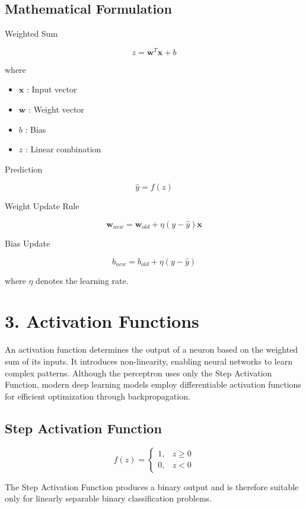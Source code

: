 \documentclass[11pt]{article}
\begin{document}
\subsection*{Mathematical Formulation}

Weighted Sum

\[
z=\mathbf{w}^{T}\mathbf{x}+b
\]

where

\begin{itemize}
\item $\mathbf{x}$ : Input vector
\item $\mathbf{w}$ : Weight vector
\item $b$ : Bias
\item $z$ : Linear combination
\end{itemize}

Prediction

\[
\hat y=f(z)
\]

Weight Update Rule

\[
\mathbf{w}_{new}
=
\mathbf{w}_{old}
+
\eta
(y-\hat y)
\mathbf{x}
\]

Bias Update

\[
b_{new}
=
b_{old}
+
\eta
(y-\hat y)
\]

where $\eta$ denotes the learning rate.


\section*{3. Activation Functions}

An activation function determines the output of a neuron based on the weighted sum of its inputs. It introduces non-linearity, enabling neural networks to learn complex patterns. Although the perceptron uses only the Step Activation Function, modern deep learning models employ differentiable activation functions for efficient optimization through backpropagation.

\subsection*{Step Activation Function}

\[
f(z)=
\begin{cases}
1,&z\ge0\\
0,&z<0
\end{cases}
\]

The Step Activation Function produces a binary output and is therefore suitable only for linearly separable binary classification problems.
\end{document}
